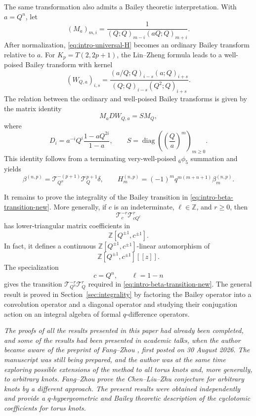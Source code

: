 \documentclass[11pt]{amsart}
\begin{document}
The same transformation also admits a Bailey theoretic interpretation.
With \(a=Q^n\), let
\[
(M_a)_{m,i}
=
\frac{1}{(Q;Q)_{m-i}(aQ;Q)_{m+i}}.
\]
After normalization, \eqref{eq:intro-universal-H} becomes an ordinary
Bailey transform relative to \(a\).  For \(K_p=T(2,2p+1)\), the
Lin--Zheng formula leads to a well-poised Bailey transform with kernel
\[
(W_{Q,a})_{i,s}
=
\frac{(a/Q;Q)_{i-s}(a;Q)_{i+s}}
{(Q;Q)_{i-s}(Q^2;Q)_{i+s}}.
\]
The relation between the ordinary and well-poised Bailey transforms is
given by the matrix identity
\begin{equation}\label{eq:intro-WP-diagonalization}
M_aDW_{Q,a}=SM_Q,
\end{equation}
where
\[
D_i=a^{-i}Q^i\frac{1-aQ^{2i}}{1-a},
\qquad
S=\operatorname{diag}
\left(\left(\frac Qa\right)^m\right)_{m\geq0}.
\]
This identity follows from a terminating very-well-poised
\({}_6\phi_5\) summation and yields
\begin{equation}\label{eq:intro-beta-transition-new}
\beta^{(n,p)}
=
\mathcal T_{Q^n}^{-(p+1)}\mathcal T_Q^{p+1}\delta,
\qquad
H_m^{(n,p)}
=
(-1)^m q^{m(m+n+1)}\beta_m^{(n,p)}.
\end{equation}

It remains to prove the integrality of the Bailey transition in
\eqref{eq:intro-beta-transition-new}.  More generally, if \(c\) is an
indeterminate, \(\ell\in\mathbb Z\), and \(r\geq0\), then
\begin{equation}\label{eq:intro-general-transition}
\mathcal T_c^{-r}\mathcal T_{cQ^\ell}^{r}
\end{equation}
has lower-triangular matrix coefficients in
\[
\mathbb Z[Q^{\pm1},c^{\pm1}].
\]
In fact, it defines a continuous
\(\mathbb Z[Q^{\pm1},c^{\pm1}]\)-linear automorphism of
\[
\mathbb Z[Q^{\pm1},c^{\pm1}][[z]].
\]
The specialization
\[
c=Q^n,
\qquad
\ell=1-n
\]
gives the transition
\(\mathcal T_{Q^n}^{-r}\mathcal T_Q^r\)
required in \eqref{eq:intro-beta-transition-new}.  The general result is
proved in Section~\ref{sec:integrality} by factoring the Bailey operator
into a convolution operator and a diagonal operator and studying their
conjugation action on an integral algebra of formal \(q\)-difference
operators.



{\itshape
The proofs of all the results presented in this paper had already been
completed, and some of the results had been presented in academic talks,
when the author became aware of the preprint of Fang--Zhou \cite{FangZhou}, first posted on 30 August 2026.  
The manuscript was still being prepared, and the author was at the same time exploring possible extensions of the method to all torus knots and, more generally,
to arbitrary knots.  Fang--Zhou prove the Chen--Liu--Zhu conjecture for
arbitrary knots by a different approach.  The present results were
obtained independently and provide a \(q\)-hypergeometric and Bailey theoretic description of the cyclotomic coefficients for torus knots.
}
\end{document}
